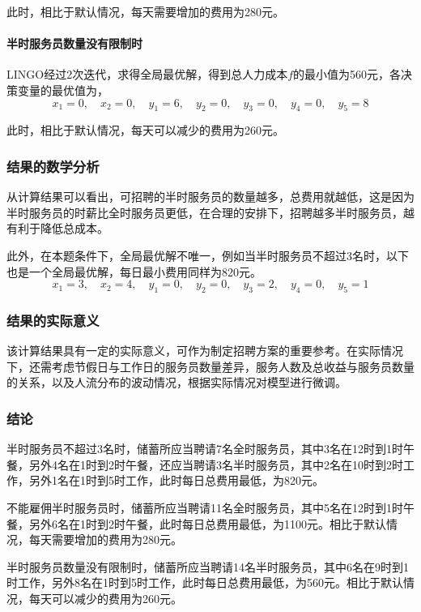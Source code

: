 此时，相比于默认情况，每天需要增加的费用为280元。

\paragraph{半时服务员数量没有限制时} LINGO经过2次迭代，求得全局最优解，得到总人力成本$f$的最小值为560元，各决策变量的最优值为，
\begin{equation}
    x_1 = 0, \quad x_2 = 0, \quad y_1 = 6, \quad y_2 = 0, \quad y_3 = 0, \quad y_4 = 0, \quad y_5 = 8
\end{equation}

此时，相比于默认情况，每天可以减少的费用为260元。

\subsubsection{结果的数学分析}

从计算结果可以看出，可招聘的半时服务员的数量越多，总费用就越低，这是因为半时服务员的时薪比全时服务员更低，在合理的安排下，招聘越多半时服务员，越有利于降低总成本。

此外，在本题条件下，全局最优解不唯一，例如当半时服务员不超过3名时，以下也是一个全局最优解，每日最小费用同样为820元。
\begin{equation}
    x_1 = 3, \quad x_2 = 4, \quad y_1 = 0, \quad y_2 = 0, \quad y_3 = 2, \quad y_4 = 0, \quad y_5 = 1
\end{equation}

\subsubsection{结果的实际意义}

该计算结果具有一定的实际意义，可作为制定招聘方案的重要参考。在实际情况下，还需考虑节假日与工作日的服务员数量差异，服务人数及总收益与服务员数量的关系，以及人流分布的波动情况，根据实际情况对模型进行微调。

\subsubsection{结论}

半时服务员不超过3名时，储蓄所应当聘请7名全时服务员，其中3名在12时到1时午餐，另外4名在1时到2时午餐，还应当聘请3名半时服务员，其中2名在10时到2时工作，另外1名在1时到5时工作，此时每日总费用最低，为820元。

不能雇佣半时服务员时，储蓄所应当聘请11名全时服务员，其中5名在12时到1时午餐，另外6名在1时到2时午餐，此时每日总费用最低，为1100元。相比于默认情况，每天需要增加的费用为280元。

半时服务员数量没有限制时，储蓄所应当聘请14名半时服务员，其中6名在9时到1时工作，另外8名在1时到5时工作，此时每日总费用最低，为560元。相比于默认情况，每天可以减少的费用为260元。
